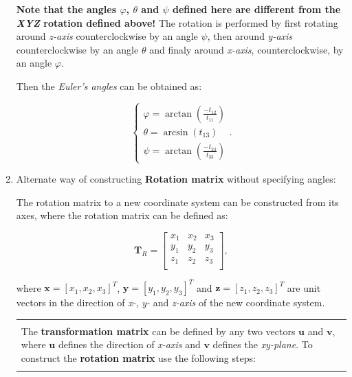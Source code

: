 \documentclass[10pt,b5paper,titlepage]{book}
\newenvironment{bbox}[1][0.96]
{
    \begin{center}
        \begin{tabular}{|p{#1\textwidth}|}
            \hline\\
}
{
            \\\\\hline
        \end{tabular}
    \end{center}
}
\begin{document}
\begin{enumerate}
        \textbf{Note that the angles $\varphi$, $\theta$ and $\psi$ defined here are
        different from the \textit{XYZ} rotation defined above!} The rotation
        is performed by first rotating around \textit{z-axis} counterclockwise
        by an angle $\psi$, then around \textit{y-axis} counterclockwise
        by an angle $\theta$ and finaly around \textit{x-axis}, counterclockwise,
        by an angle $\varphi$.

        Then the \textit{Euler's angles} can be obtained as:

        \begin{equation}
            \left\{ \begin{array}{l}
                \varphi = \arctan \left( \frac{-t_{12}}{t_{11}} \right)\\
                \theta = \arcsin \left( t_{13} \right) \\
                \psi = \arctan \left( \frac{-t_{23}}{t_{33}} \right)
            \end{array} \right.
        .\end{equation}


    \item Alternate way of constructing \textbf{Rotation matrix} without specifying
        angles:

        The rotation matrix to a new coordinate system can be constructed from
        its axes, where the rotation matrix can be defined as:

        \begin{equation}
            \mathbf{T}_{R} = \begin{bmatrix}
                x_1 & x_2 & x_3 \\
                y_1 & y_2 & y_3 \\
                z_1 & z_2 & z_3 \\
            \end{bmatrix}
        ,\end{equation}

        where $\mathbf{x} = [x_1, x_2, x_3]^{T}$, $\mathbf{y} = [y_1, y_2, y_3]^{T}$
        and  $\mathbf{z} = [z_1, z_2, z_3]^{T}$ are unit vectors in the direction
        of \textit{x-}, \textit{y-} and \textit{z-axis} of the new coordinate
        system.


        \begin{bbox}[0.85]
            The \textbf{transformation matrix} can be defined by any two vectors
            $\mathbf{u}$ and $\mathbf{v}$, where $\mathbf{u}$ defines the direction
            of \textit{x-axis} and $\mathbf{v}$ defines the \textit{xy-plane}.
            To construct the \textbf{rotation matrix} use the following steps:


\end{bbox}
\end{enumerate}
\end{document}
